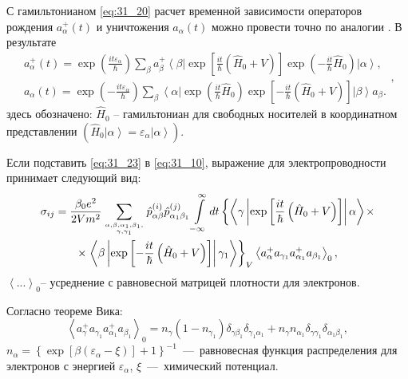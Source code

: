 С гамильтонианом \eqref{eq:31_20} расчет временной зависимости операторов
рождения $a_\alpha ^ + (t)$ и уничтожения $a_\alpha (t)$ можно
провести точно по аналогии \cite{Khamidullin2002}. В результате
\begin{equation}
\begin{array}{c}\label{eq:31_23}
\displaystyle a_\alpha ^ + (t) = \exp\left(
{\frac{it\varepsilon _\alpha }{\hbar }} \right)\sum\limits_\beta
{a_\beta ^ + \left\langle \beta \right|} \exp\left[
{\frac{it}{\hbar }\left( {\hat {H}_0 + V} \right)}
\right]\exp\left( { - \frac{it}{\hbar }\hat {H}_0 }
\right)\left| \alpha \right\rangle ,\\
\displaystyle a_\alpha (t) = \exp\left( { - \frac{it\varepsilon
		_\alpha }{\hbar }} \right)\sum\limits_\beta {\left\langle \alpha
	\right|} \exp\left( {\frac{it}{\hbar }\hat {H}_0 }
\right)\exp\left[ { - \frac{it}{\hbar }\left( {\hat {H}_0 + V}
	\right)} \right]\left| \beta \right\rangle a_\beta .
\end{array},
\end{equation}
здесь обозначено: $\hat {H}_0 $ -- гамильтониан для свободных
носителей в координатном представлении $\left( \hat {H}_0 \left| \alpha
\right\rangle = \varepsilon _\alpha \left| \alpha \right\rangle
\right) $.

Если подставить \eqref{eq:31_23}  в \eqref{eq:31_10}, выражение для
электропроводности принимает следующий вид:
\begin{multline}
\sigma_{ij}=\frac{\beta_0e^2}{2Vm^2}\sum\limits_{\alpha	,\beta ,\alpha _1 ,\beta _1, \atop \gamma ,\gamma _1 } 
\hat{p}_{\alpha \beta}^{(i)} \hat {p}_{\alpha _1 \beta_1}^{(j)}
\int\limits_{- \infty }^\infty
{dt \left\{ \left\langle \gamma \left|\exp\left[\frac{it}{\hbar}\left(\hat{H}_0 + V\right)\right]\right|\alpha\right\rangle\right.}\times\\
\times\displaystyle\left.\left\langle \beta
\left|\exp\left[-\frac{it}{\hbar}\left(\hat {H}_0 +
V\right)\right]\right|\gamma_1\right\rangle\right\}_V \left\langle
{a_\alpha ^ + a_{\gamma _1 } a_{\alpha _1 }^ + a_{\beta _1 } }
\right\rangle _0,
\end{multline}
$\left\langle
{...} \right\rangle _0 $-- усреднение с равновесной матрицей
плотности для электронов.

Согласно теореме Вика:
\begin{equation}\label{eq:31_26}
\left\langle {a_\gamma ^ + a_{\gamma _1 } a_{\alpha _1
	}^ + a_{\beta _1 } } \right\rangle _0 = n_\gamma \left( {1 -
	n_{\gamma _1 } } \right)\delta _{\gamma \beta _1 } \delta _{\gamma
	_1 \alpha _1 } + n_\gamma n_{\alpha _1 } \delta _{\gamma \gamma _1
} \delta _{\alpha _1 \beta _1 } ,
\end{equation}
$n_\alpha = \left\{ {\exp\left[ {\beta \left( {\varepsilon _\alpha - \xi } \right)} \right] + 1} \right\}^{ - 1}$~---~равновесная
функция распределения для электронов с энергией $\varepsilon _\alpha$, $\xi $~---~химический потенциал.

